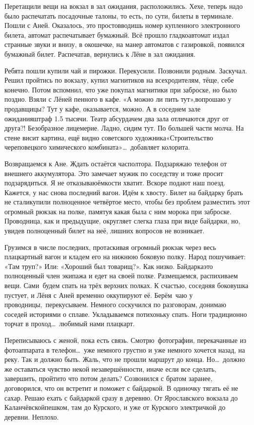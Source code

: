 Перетащили вещи на вокзал в зал ожидания, расположились. Хе\sdash хе, теперь надо было распечатать посадочные талоны, то есть, по сути, билеты в терминале. Пошли с Аней. Оказалось, это просто\mdash вводишь номер купленного электронного билета, автомат распечатывает бумажный. Всё прошло гладко\mdash автомат издал странные звуки и внизу, в окошечке, на манер автоматов с газировкой, появился бумажный билет. Распечатав, вернулись к Лёне в зал ожидания. 

Ребята пошли купили чай и пирожки. Перекусили. Позвонили родным. Заскучал. Решил пройтись по вокзалу, купил магнитиков на всех\mdash родителям, тёще, себе конечно. Потом вспомнил, что уже покупал магнитики при заброске, но было поздно. Взяли с Лёней пенного в кафе. «А можно ли пить тут»,\mdash вопрошаю у продавщицы? Тут у кафе, оказывается, можно. А в соседнем зале ожидания\mdash штраф 1.5 тысячи. Театр абсурда\mdash чем два зала отличаются друг от друга?! Безобразное лицемерие. Ладно, сидим тут. По большей части молча. На стене висит картина, ещё видно советского художника\mdash «Строительство череповецкого химического комбината»\ldots~добавляет колорита. 

Возвращаемся к Ане. Ждать остаётся час\sdash полтора. Подзаряжаю телефон от внешнего аккумулятора. Это замечает мужик по соседству и тоже просит подзарядиться. Я не отказываю\mdash ёмкости хватит. Вскоре подают наш поезд. Кажется, у нас снова последний вагон. Идём к хвосту. Билет на байдарку брать не стали\mdash купили полноценное четвёртое место, чтобы без проблем разместить этот огромный рюкзак на полке, памятуя какая была с ним морока при заброске. Проводница, как и предыдущие, округляет слегка глаза при виде байдарки, но, увидев полноценный билет на неё, лишних вопросов не возникает.
 
Грузимся в числе последних, протаскивая огромный рюкзак через весь плацкартный вагон и кладем его на нижнюю боковую полку. Народ пошучивает: «Там труп?» Или: «Хороший был товарищ?». Как низко. Байдарка\mdash это полноценный член экипажа и едет на своей полке. Размещаемся, распихиваем вещи. Сами~будем спать на трёх верхних полках. К счастью, соседняя боковушка пустует, и Лёня с Аней временно оккупируют её. Берём~чаю у проводницы,~перекусываем. Немного соскучился по разговорам, донимаю соседей историями о сплаве. Укладываемся потихоньку спать. Ноги традиционно торчат в проход\ldots~любимый нами плацкарт.

Переписываюсь с женой, пока есть связь. Смотрю~фотографии, перекачанные из фотоаппарата в телефон\ldots~уже немного грустно и уже немного хочется назад, на реку. Так и должно быть. Жаль, что не прошли маршрут до конца. Но\ldots~должно же оставаться чувство некой незавершённости, иначе если все сделать, завершить, пройти\mdash то что потом делать? Созвонился с братом заранее, договорился, что он встретит и поможет с байдаркой. В одиночку тягать её не сахар. Решаю ехать с байдаркой сразу в деревню. От Ярославского вокзала до Каланчёвской\mdash пешком, там до Курского, и уже от Курского электричкой до деревни. Неплохо. 

